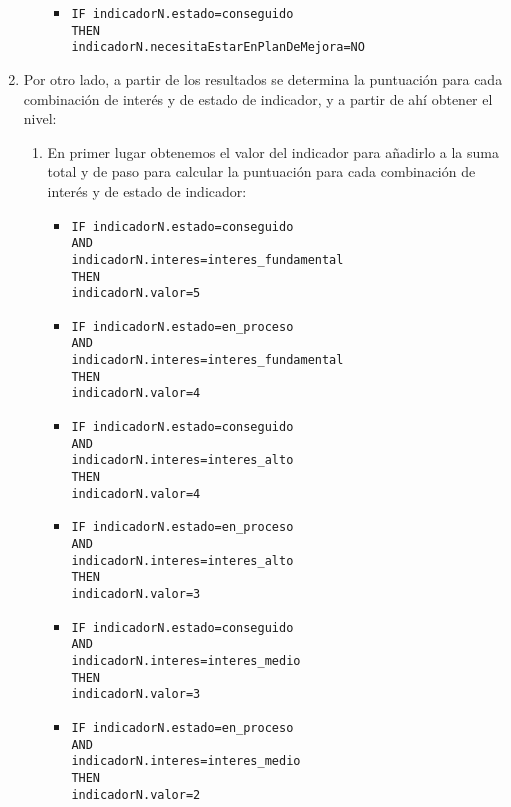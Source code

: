 \begin{enumerate}
\begin{enumerate}
\begin{itemize}
            \item \texttt{IF indicadorN.estado=conseguido \\THEN\\ indicadorN.necesitaEstarEnPlanDeMejora=NO}
        \end{itemize}
    \end{enumerate} 
    \item Por otro lado, a partir de los resultados se determina la puntuación para cada combinación de interés y de estado de indicador, y a partir de ahí obtener el nivel:
    \begin{enumerate}
        \item En primer lugar obtenemos el valor del indicador para añadirlo a
        la suma total y de paso para calcular la puntuación para cada
        combinación de interés y de estado de indicador:
        \begin{itemize}
            \item \texttt{IF indicadorN.estado=conseguido \\AND\\ indicadorN.interes=interes\_fundamental \\THEN\\ indicadorN.valor=5}
            \item \texttt{IF indicadorN.estado=en\_proceso \\AND\\ indicadorN.interes=interes\_fundamental \\THEN\\ indicadorN.valor=4}
            \item \texttt{IF indicadorN.estado=conseguido \\AND\\ indicadorN.interes=interes\_alto \\THEN\\ indicadorN.valor=4}
            \item \texttt{IF indicadorN.estado=en\_proceso \\AND\\ indicadorN.interes=interes\_alto \\THEN\\ indicadorN.valor=3}
            \item \texttt{IF indicadorN.estado=conseguido \\AND\\ indicadorN.interes=interes\_medio \\THEN\\ indicadorN.valor=3}
            \item \texttt{IF indicadorN.estado=en\_proceso \\AND\\ indicadorN.interes=interes\_medio \\THEN\\ indicadorN.valor=2}

\end{itemize}
\end{enumerate}
\end{enumerate}
